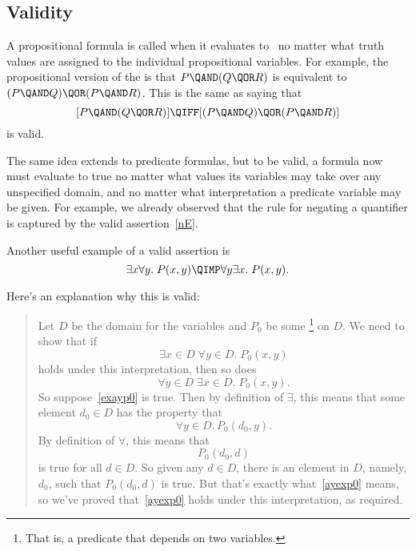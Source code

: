 \iffalse Logicians have worked very hard to define strict rules for the
use of logic notation so that ideas can be expressed with absolute rigor.
It's all quite charming and clever.  However, the sad irony is that
applied mathematicans usually use their beloved notation as a crude
shorthand, breaking the rules and abusing the notation willy-nilly ---sort
of like pounding nails with fine china.  \fi

\subsection{Validity}

A propositional formula is called  when it evaluates to \true\
no matter what truth values are assigned to the individual propositional
variables.  For example, the propositional version of the 
is that $P \QAND (Q \QOR R)$ is equivalent to $(P \QAND Q) \QOR (P \QAND
R)$.  This is the same as saying that
\[
[P \QAND (Q \QOR R)] \QIFF [(P \QAND Q) \QOR (P \QAND R)]
\]
is valid.

The same idea extends to predicate formulas, but to be valid, a
formula now must evaluate to true no matter what values its variables
may take over any unspecified domain, and no matter what
interpretation a predicate variable may be given.  For example, we
already observed that the rule for negating a quantifier is captured
by the valid assertion~\eqref{nE}.

Another useful example of a valid assertion is
\begin{equation}\label{eaimpliesae}
\exists x \forall y.\; P(x,y) \QIMP \forall y \exists x.\; P(x,y).
\end{equation}

Here's an explanation why this is valid:

\begin{quote}
Let $D$ be the domain for the variables and $P_0$ be some
\footnote{That is, a predicate that depends on two variables.}
on $D$.  We need to show that if
\begin{equation}\label{exayp0}
\exists x \in D\; \forall y \in D.\; P_0(x,y)
\end{equation}
holds under this interpretation, then so does
\begin{equation}\label{ayexp0}
\forall y \in D\; \exists x \in D.\; P_0(x,y).
\end{equation}
So suppose~\eqref{exayp0} is true.  Then by definition of $\exists$, this
means that some element $d_0 \in D$ has the property that
\[
\forall y \in D.\, P_0(d_0, y).
\]
By definition of $\forall$, this means that
\[
P_0(d_0,d)
\]
is true for all $d \in D$.  So given any $d \in D$, there is an element in
$D$, namely, $d_0$, such that $P_0(d_0,d)$ is true.  But that's exactly
what~\eqref{ayexp0} means, so we've proved that~\eqref{ayexp0} holds under
this interpretation, as required.
\end{quote}

